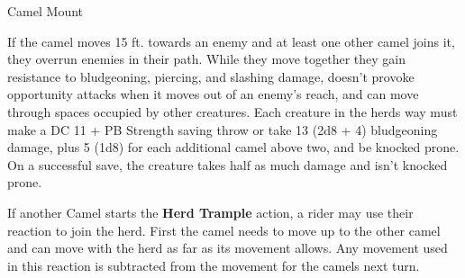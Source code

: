\documentclass[letterpaper,twocolumn,openany,nodeprecatedcode]{dndbook}
\begin{document}
\begin{DndMonster}[float*=b,width=\textwidth + 8pt]{Camel Mount}
\begin{multicols}{2}
    If the camel moves 15 ft. towards an enemy and at least one other camel joins it, they overrun enemies in their path. While they move together they gain resistance to bludgeoning, piercing, and slashing damage, doesn’t provoke opportunity attacks when it moves out of an enemy’s reach, and can move through spaces occupied by other creatures. Each creature in the herds way must make a DC 11 + PB Strength saving throw or take 13 (2d8 + 4) bludgeoning damage, plus 5 (1d8) for each additional camel above two, and be knocked prone. On a successful save, the creature takes half as much damage and isn’t knocked prone.


    If another Camel starts the \textbf{Herd Trample} action, a rider may use their reaction to join the herd. First the camel needs to move up to the other camel and can move with the herd as far as its movement allows. Any movement used in this reaction is subtracted from the movement for the camels next turn.

  \end{multicols}
\end{DndMonster}
\end{document}
